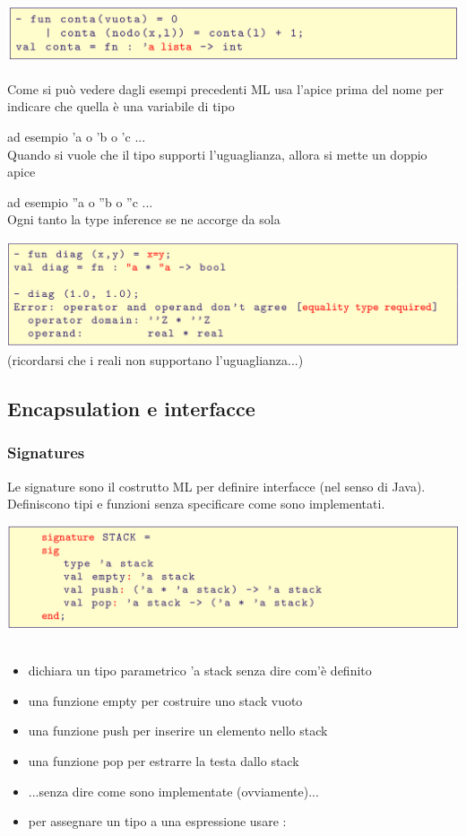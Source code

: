 \documentclass[10pt]{article}
\begin{document}
\includegraphics[scale=0.2]{Immagini/ml44.png}
\\\\
Come si può vedere dagli esempi precedenti ML usa l’apice prima
del nome per indicare che quella è una variabile di tipo

ad esempio ’a o ’b o ’c ...
\\
Quando si vuole che il tipo supporti l’uguaglianza, allora si mette
un doppio apice

ad esempio ”a o ”b o ”c ...
\\
Ogni tanto la type inference se ne accorge da sola

\includegraphics[scale=0.2]{Immagini/ml45.png}
\\
(ricordarsi che i reali non supportano l’uguaglianza...)
\subsection{Encapsulation e interfacce}
\subsubsection{Signatures}
Le signature sono il costrutto ML per definire interfacce (nel
senso di Java).
Definiscono tipi e funzioni senza specificare come sono
implementati.

\includegraphics[scale=0.2]{Immagini/ml46.png}
\\\\
\begin{itemize}
    \item dichiara un tipo parametrico ’a stack senza dire com’è definito
\item una funzione empty per costruire uno stack vuoto
\item una funzione push per inserire un elemento nello stack
\item una funzione pop per estrarre la testa dallo stack
\item ...senza dire come sono implementate (ovviamente)...
\item per assegnare un tipo a una espressione usare :
\end{itemize}
\end{document}
